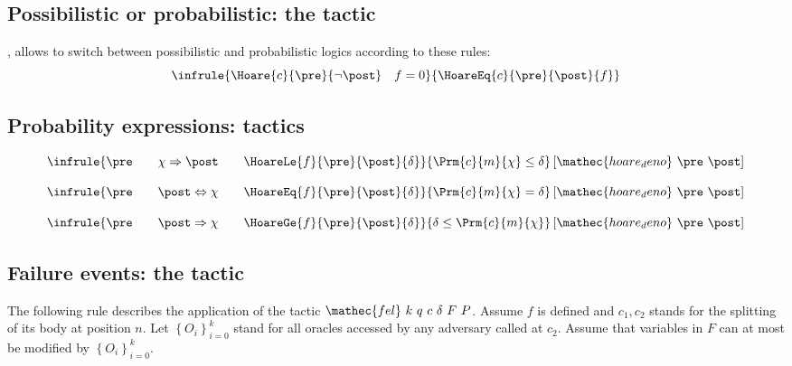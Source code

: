 \subsection{Possibilistic or probabilistic: the  tactic}

\Syntax {}, 
allows to switch between possibilistic and probabilistic logics
according to these rules:
\begin{displaymath}
\infrule{
  \Hoare{c}{\pre}{\neg \post} \quad f = 0
}{
  \HoareEq{c}{\pre}{\post}{f}
}
\end{displaymath}

\subsection{Probability expressions:  tactics}


\begin{displaymath}
\infrule{
    \pre 
    \qquad 
    \chi\Rightarrow\post 
    \qquad 
    \HoareLe{f}{\pre}{\post}{\delta}
}{
  \Prm{c}{m}{\chi} \leq \delta
}\left[\mathec{hoare_deno}\ \pre\ \post\right]
\end{displaymath}

\begin{displaymath}
\infrule{
    \pre 
    \qquad 
    \post\Leftrightarrow \chi 
    \qquad 
    \HoareEq{f}{\pre}{\post}{\delta}
}{
  \Prm{c}{m}{\chi} = \delta
}\left[\mathec{hoare_deno}\ \pre\ \post\right]
\end{displaymath}

\begin{displaymath}
\infrule{
    \pre 
    \qquad 
    \post\Rightarrow\chi
    \qquad 
    \HoareGe{f}{\pre}{\post}{\delta}
}{
  \delta \leq \Prm{c}{m}{\chi}
}\left[\mathec{hoare_deno}\ \pre\ \post\right]
\end{displaymath}



\subsection{Failure events: the  tactic}
%
The following rule describes the application of the tactic
$\mathec{fel}\ k\ q\ c\ \delta\ F\ P$.  Assume $f$ is defined and
$c_1,c_2$ stands for the splitting of its body at position $n$. Let
$\left\{O_i\right\}_{i=0}^k$ stand for all oracles accessed by any
adversary called at $c_2$. Assume that variables in $F$ can at most be
modified by $\left\{O_i\right\}_{i=0}^k$.
 
